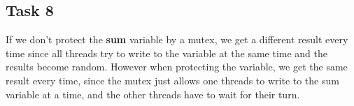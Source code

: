 \documentclass[a4paper]{scrartcl}
\begin{document}
    \subsection{Task 8}
        If we don't protect the \textbf{sum} variable by a mutex, we get a
        different result every time since all threads try to write to the
        variable at the same time and the results become random. However when
        protecting the variable, we get the same result every time, since the
        mutex just allows one threads to write to the sum variable at a time,
        and the other threads have to wait for their turn.
    
\end{document}
